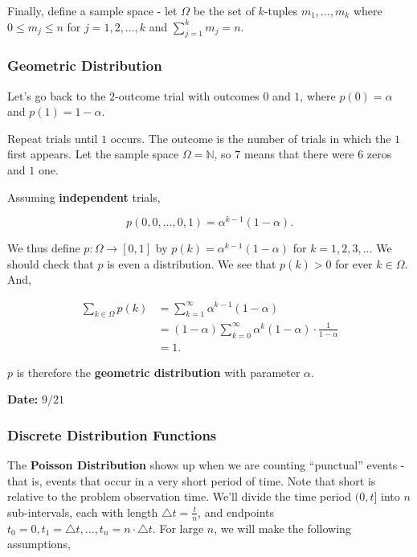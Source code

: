 \documentclass[12pt]{article}
\newcommand{\N}{\mathbb{N}}
\begin{document}
\noindent
Finally, define a sample space - let $\Omega$ be the set of $k$-tuples $m_1, \ldots, m_k$ where $0 \leq m_j \leq n$ for $j = 1, 2, \ldots, k$ and $\sum_{j=1}^{k} m_j = n$.

\subsubsection*{Geometric Distribution}
\noindent
Let's go back to the $2$-outcome trial with outcomes $0$ and $1$, where $p(0) = \alpha$ and $p(1) = 1-\alpha$. 

\begin{tcolorbox}
Repeat trials until $1$ occurs. The outcome is the number of trials in which the $1$ first appears. Let the sample space $\Omega = \N$, so $7$ means that there were $6$ zeros and $1$ one. 

\noindent
Assuming \textbf{independent} trials, 

\begin{equation*}
p(0, 0, \ldots, 0, 1) = \alpha^{k-1} (1- \alpha).
\end{equation*}
\end{tcolorbox}

\noindent
We thus define $p : \Omega \rightarrow [0, 1]$ by $p(k) = \alpha^{k-1} (1- \alpha)$ for $k = 1, 2, 3, \ldots$ We should check that $p$ is even a distribution. We see that $p(k) > 0$ for ever $k \in \Omega$. And,

\begin{align*}
\sum_{k \in \Omega} p(k) & = \sum_{k = 1}^{\infty} \alpha^{k-1} (1- \alpha) \\
& = (1- \alpha) \sum_{k = 0}^{\infty} \alpha^k (1 - \alpha) \cdot \frac{1}{1- \alpha} \\
& = 1.
\end{align*}

\noindent
$p$ is therefore the \textbf{geometric distribution} with parameter $\alpha$.

\begin{flushright}
\textbf{Date: } $9/21$
\end{flushright}

\subsubsection*{Discrete Distribution Functions}
\noindent
The \textbf{Poisson Distribution} shows up when we are counting ``punctual'' events - that is, events that occur in a very short period of time. Note that short is relative to the problem observation time. We'll divide the time period $(0, t]$ into $n$ sub-intervals, each with length $\triangle t = \frac{t}{n}$, and endpoints $t_0 = 0, t_1 = \triangle t, \ldots, t_n =  n \cdot \triangle t$. For large $n$, we will make the following assumptions, 
\end{document}
